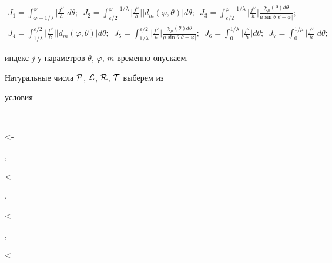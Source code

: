 \begin{gather*} 


J_1=\int^\varphi_{\varphi-1/\lambda} 


\bigg|\frac{f^\vee}{h}\bigg|d\theta;\ \; 


J_2=\int^{\varphi-1/\lambda}_{\varepsilon/2} 


\bigg|\frac{f^\vee}{h}\bigg||d_m(\varphi,\theta)|d\theta; 


\ \; J_3=\int^{\varphi-1/\lambda}_{\varepsilon/2} 


\bigg|\frac{f^\vee}{h}\bigg| 


\frac{\chi_\mu(\theta)d\theta}{\mu\sin\theta|\theta-\varphi|}; \\ 


% 


J_4=\int^{\varepsilon/2}_{1/\lambda} 


\bigg|\frac{f^\vee}{h}\bigg||d_m(\varphi,\theta)|d\theta; 


\ \; J_5=\int^{\varepsilon/2}_{1/\lambda} 


\bigg|\frac{f^\vee}{h}\bigg| 


\frac{\chi_\mu(\theta)d\theta}{\mu\sin\theta|\theta-\varphi|}; 


\ \;J_6=\int^{1/\lambda}_0 


\bigg|\frac{f^\vee}{h}\bigg|d\theta; \ \; 


J_7=\int^{1/\mu}_0 


\bigg|\frac{f^\vee}{h}\bigg|d\theta; 


\end{gather*} 


индекс $j$ у параметров $\theta$, $\varphi$, $m$ временно опускаем. 


 


Натуральные числа $\cal P$, $\cal L$, $\cal R$, $\cal T$ выберем из 


условия 


$$ 


<\varphi-\le 


,\quad 


<\pi\le 


,\quad 


<\le 


,\quad 


<\le 


